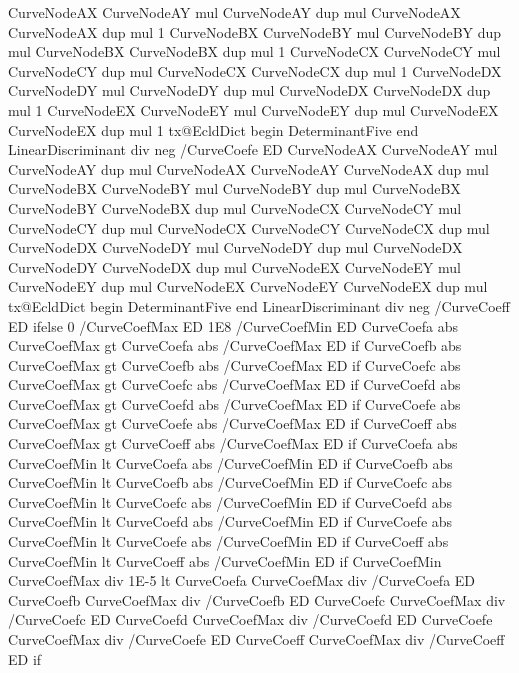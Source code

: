 {{        CurveNodeAX CurveNodeAY mul CurveNodeAY dup mul CurveNodeAX CurveNodeAX dup mul 1
        CurveNodeBX CurveNodeBY mul CurveNodeBY dup mul CurveNodeBX CurveNodeBX dup mul 1
        CurveNodeCX CurveNodeCY mul CurveNodeCY dup mul CurveNodeCX CurveNodeCX dup mul 1
        CurveNodeDX CurveNodeDY mul CurveNodeDY dup mul CurveNodeDX CurveNodeDX dup mul 1
        CurveNodeEX CurveNodeEY mul CurveNodeEY dup mul CurveNodeEX CurveNodeEX dup mul 1
        tx@EcldDict begin DeterminantFive end LinearDiscriminant div neg /CurveCoefe ED
        CurveNodeAX CurveNodeAY mul CurveNodeAY dup mul CurveNodeAX CurveNodeAY CurveNodeAX dup mul
        CurveNodeBX CurveNodeBY mul CurveNodeBY dup mul CurveNodeBX CurveNodeBY CurveNodeBX dup mul
        CurveNodeCX CurveNodeCY mul CurveNodeCY dup mul CurveNodeCX CurveNodeCY CurveNodeCX dup mul
        CurveNodeDX CurveNodeDY mul CurveNodeDY dup mul CurveNodeDX CurveNodeDY CurveNodeDX dup mul
        CurveNodeEX CurveNodeEY mul CurveNodeEY dup mul CurveNodeEX CurveNodeEY CurveNodeEX dup mul
        tx@EcldDict begin DeterminantFive end LinearDiscriminant div neg /CurveCoeff ED
      } ifelse
      0 /CurveCoefMax ED 1E8 /CurveCoefMin ED
      CurveCoefa abs CurveCoefMax gt {CurveCoefa abs /CurveCoefMax ED} if
      CurveCoefb abs CurveCoefMax gt {CurveCoefb abs /CurveCoefMax ED} if
      CurveCoefc abs CurveCoefMax gt {CurveCoefc abs /CurveCoefMax ED} if
      CurveCoefd abs CurveCoefMax gt {CurveCoefd abs /CurveCoefMax ED} if
      CurveCoefe abs CurveCoefMax gt {CurveCoefe abs /CurveCoefMax ED} if
      CurveCoeff abs CurveCoefMax gt {CurveCoeff abs /CurveCoefMax ED} if
      CurveCoefa abs CurveCoefMin lt {CurveCoefa abs /CurveCoefMin ED} if
      CurveCoefb abs CurveCoefMin lt {CurveCoefb abs /CurveCoefMin ED} if
      CurveCoefc abs CurveCoefMin lt {CurveCoefc abs /CurveCoefMin ED} if
      CurveCoefd abs CurveCoefMin lt {CurveCoefd abs /CurveCoefMin ED} if
      CurveCoefe abs CurveCoefMin lt {CurveCoefe abs /CurveCoefMin ED} if
      CurveCoeff abs CurveCoefMin lt {CurveCoeff abs /CurveCoefMin ED} if
      CurveCoefMin CurveCoefMax div 1E-5 lt {
        CurveCoefa CurveCoefMax div /CurveCoefa ED
        CurveCoefb CurveCoefMax div /CurveCoefb ED
        CurveCoefc CurveCoefMax div /CurveCoefc ED
        CurveCoefd CurveCoefMax div /CurveCoefd ED
        CurveCoefe CurveCoefMax div /CurveCoefe ED
        CurveCoeff CurveCoefMax div /CurveCoeff ED
      } if
}
